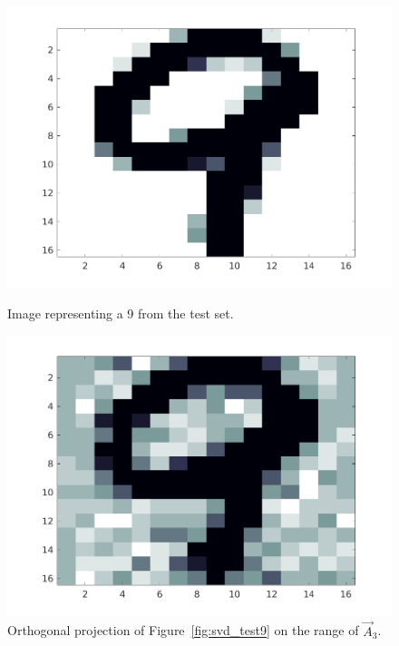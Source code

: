 \begin{figure}[H]
    \begin{minipage}{0.45\textwidth}
        \includegraphics[width = \textwidth]{images/svd/test9.png}
        \caption{Image representing a 9 from the test set.}\label{fig:svd_test9}
    \end{minipage}
    \hspace{1em}
    \begin{minipage}{0.45\textwidth}
        \includegraphics[width = \textwidth]{images/svd/test9_proj.png}
        \caption{Orthogonal projection of Figure~\ref{fig:svd_test9} on the range of \(\vec{A}_3\).}\label{fig:svd_test9_proj}
    \end{minipage}
\end{figure}

